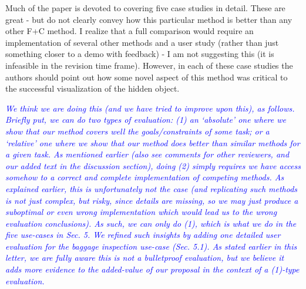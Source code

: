 \documentclass[a4paper,10pt]{article}
\newcommand{\rr}[1]{\emph{\textcolor{blue}{#1}}}
\begin{document}
    Much of the paper is devoted to covering five case studies in detail. These are
    great - but do not clearly convey how this particular method is better than any
    other F+C method. I realize that a full comparison would require an implementation
    of several other methods and a user study (rather than just something closer to a
    demo with feedback) - I am not suggesting this (it is infeasible in the revision
    time frame). However, in each of these case studies the authors should point out
    how some novel aspect of this method was critical to the successful visualization
    of the hidden object.
    
    \rr{We think we are doing this (and we have tried to improve upon this), as follows. Briefly put, we can do two types of evaluation: (1) an `absolute' one where we show that our method covers well the goals/constraints of some task; or a `relative' one where we show that our method does better than similar methods for a given task. As mentioned earlier (also see comments for other reviewers, and our added text in the discussion section), doing (2) simply requires we have access somehow to a correct and complete implementation of competing methods. As explained earlier, this is unfortunately not the case (and replicating such methods is not just complex, but risky, since details are missing, so we may just produce a suboptimal or even wrong implementation which would lead us to the wrong evaluation conclusions). As such, we can only do (1), which is what we do in the five use-cases in Sec. 5. We refined such insights by adding one detailed user evaluation for the baggage inspection use-case (Sec. 5.1). As stated earlier in this letter, we are fully aware this is not a bulletproof evaluation, but we believe it adds more evidence to the added-value of our proposal in the context of a (1)-type evaluation.}\\
\end{document}
